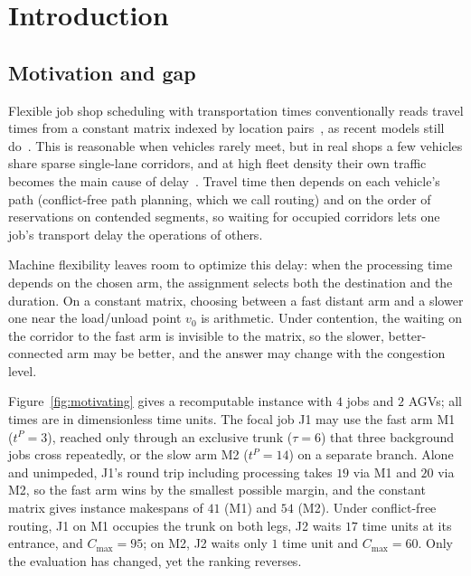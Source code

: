 \documentclass[preprint,review,12pt,authoryear,doubleblind]{elsarticle}
\begin{document}
\linenumbers

\section{Introduction}
\label{sec:Chapter_I}

\subsection{Motivation and gap}

Flexible job shop scheduling with transportation times conventionally reads travel times from a constant matrix indexed by location pairs~\citep{xin2025review}, as recent models still do~\citep{meng2025cp,qin2026knowledge,jafarian2026integrated}.
This is reasonable when vehicles rarely meet, but in real shops a few vehicles share sparse single-lane corridors, and at high fleet density their own traffic becomes the main cause of delay~\citep{kim2026congestion}.
Travel time then depends on each vehicle's path (conflict-free path planning, which we call routing) and on the order of reservations on contended segments, so waiting for occupied corridors lets one job's transport delay the operations of others.

Machine flexibility leaves room to optimize this delay: when the processing time depends on the chosen arm, the assignment selects both the destination and the duration.
On a constant matrix, choosing between a fast distant arm and a slower one near the load/unload point $v_0$ is arithmetic.
Under contention, the waiting on the corridor to the fast arm is invisible to the matrix, so the slower, better-connected arm may be better, and the answer may change with the congestion level.

Figure~\ref{fig:motivating} gives a recomputable instance with $4$ jobs and $2$ AGVs; all times are in dimensionless time units.
The focal job J1 may use the fast arm M1 ($t^P=3$), reached only through an exclusive trunk ($\tau=6$) that three background jobs cross repeatedly, or the slow arm M2 ($t^P=14$) on a separate branch.
Alone and unimpeded, J1's round trip including processing takes $19$ via M1 and $20$ via M2, so the fast arm wins by the smallest possible margin, and the constant matrix gives instance makespans of $41$ (M1) and $54$ (M2).
Under conflict-free routing, J1 on M1 occupies the trunk on both legs, J2 waits $17$ time units at its entrance, and $C_{\max}=95$; on M2, J2 waits only $1$ time unit and $C_{\max}=60$.
Only the evaluation has changed, yet the ranking reverses.
\end{document}
